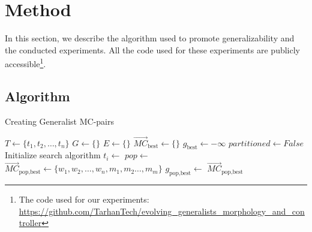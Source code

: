 
\section{Method}
    In this section, we describe the algorithm used to promote generalizability and the conducted experiments. All the code used for these experiments are publicly accessible\footnote{The code used for our experiments: \url{https://github.com/TarhanTech/evolving_generalists_morphology_and_controller}}.
    
    \subsection{Algorithm}
        \begin{algorithm}
        \caption{Creating Generalist MC-pairs}
        \begin{algorithmic}[1] %
            \State $T \gets \{t_1, t_2, \ldots, t_n\}$
            \State $G \gets \{\}$
            \State $E \gets \{\}$
                \State $\overrightarrow{MC}_{\text{best}} \gets \{\}$
                \State $g_{\text{best}} \gets -\infty$
                \State $partitioned \gets False$
                \State Initialize search algorithm
                \State
                    \State $t_i \gets$  
                    \State $pop \gets$  
                    \State $\overrightarrow{MC}_{\text{pop,best}} \gets \{w_1, w_2, \ldots, w_n, m_1, m_2 \ldots, m_m\}$
                    \State $g_{\text{pop,best}} \gets$  $\overrightarrow{MC}_{\text{pop,best}}$
                    

\end{algorithmic}
\end{algorithm}
